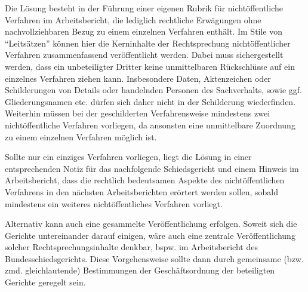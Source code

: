 Die Lösung besteht in der Führung einer eigenen Rubrik für nichtöffentliche Verfahren im Arbeitsbericht, die lediglich rechtliche Erwägungen ohne nachvollziehbaren Bezug zu einem einzelnen Verfahren enthält.
Im Stile von \enquote{Leitsätzen} können hier die Kerninhalte der Rechtsprechung nichtöffentlicher Verfahren zusammenfassend veröffentlicht werden.
Dabei muss sichergestellt werden, dass ein unbeteiligter Dritter keine unmittelbaren Rückschlüsse auf ein einzelnes Verfahren ziehen kann.
Insbesondere Daten, Aktenzeichen oder Schilderungen von Details oder handelnden Personen des Sachverhalts, sowie ggf. Gliederungsnamen etc. dürfen sich daher nicht in der Schilderung wiederfinden.
Weiterhin müssen bei der geschilderten Verfahrensweise mindestens zwei nichtöffentliche Verfahren vorliegen, da ansonsten eine unmittelbare Zuordnung zu einem einzelnen Verfahren möglich ist.

Sollte nur ein einziges Verfahren vorliegen, liegt die Lösung in einer entsprechenden Notiz für das nachfolgende Schiedsgericht und einem Hinweis im Arbeitsbericht, dass die rechtlich bedeutsamen Aspekte des nichtöffentlichen Verfahrens in den nächsten Arbeitsberichten erörtert werden sollen, sobald mindestens ein weiteres nichtöffentliches Verfahren vorliegt.

Alternativ kann auch eine gesammelte Veröffentlichung erfolgen.
Soweit sich die Gerichte untereinander darauf einigen, wäre auch eine zentrale Veröffentlichung solcher Rechtsprechungsinhalte denkbar, bspw. im Arbeitsbericht des Bundesschiedsgerichts.
Diese Vorgehensweise sollte dann durch gemeinsame (bzw. zmd. gleichlautende) Bestimmungen der Geschäftsordnung der beteiligten Gerichte geregelt sein.

\chapterbib
